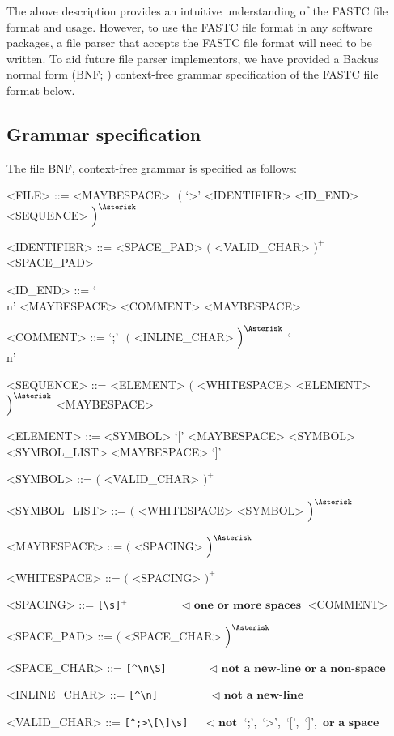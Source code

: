 \documentclass[12pt]{article}
\begin{document}
The above description provides an intuitive understanding of the FASTC file format and usage. However, to use the FASTC file format in any software packages, a file parser that accepts the FASTC file format will need to be written. To aid future file parser implementors, we have provided a Backus normal form (BNF; \citealp{Naur1961}) context-free grammar specification of the FASTC file format below.

\pagebreak

\subsection{Grammar specification}
The file BNF, context-free grammar is specified as follows:

\setlength{\grammarindent}{10em} %

\begin{grammar}

  <FILE>         ::=  <MAYBESPACE> $\,\,\Big($ `>' <IDENTIFIER> <ID_END> <SEQUENCE> $\Big)^{\Asterisk}$

  <IDENTIFIER>   ::=  <SPACE_PAD> $\Big($ <VALID_CHAR> $\Big)^{+}$ <SPACE_PAD>

  <ID_END>       ::=  `\\n' <MAYBESPACE>
                 \alt <COMMENT> <MAYBESPACE>

  <COMMENT>      ::=  `;' $\,\,\Big($ <INLINE_CHAR> $\Big)^{\Asterisk}$ `\\n'

  <SEQUENCE>     ::=  <ELEMENT> $\Big($ <WHITESPACE> <ELEMENT> $\Big)^{\Asterisk}$ <MAYBESPACE>
  
  <ELEMENT>      ::=  <SYMBOL>
                 \alt `[' <MAYBESPACE> <SYMBOL> <SYMBOL_LIST> <MAYBESPACE> `]'
 
  <SYMBOL>       ::=  $\Big($ <VALID_CHAR> $\Big)^{+}$
                 
  <SYMBOL_LIST>  ::=  $\Big($ <WHITESPACE> <SYMBOL> $\Big)^{\Asterisk}$
  
  <MAYBESPACE>   ::=  $\Big($ <SPACING> $\Big)^{\Asterisk}$

  <WHITESPACE>   ::=  $\Big($ <SPACING>  $\Big)^{+}$

  <SPACING>      ::=  \verb![\s]!$^{+}$  $\quad\,\quad\quad\quad \lhd \,\, \textbf{one or more spaces}$
                 \alt <COMMENT>

  <SPACE_PAD>    ::=  $\Big($ <SPACE_CHAR> $\Big)^{\Asterisk}$

  <SPACE_CHAR>   ::=  \verb![^\n\S]!     $\quad\,\quad\quad      \lhd \,\, \textbf{not a new-line or a non-space}$

  <INLINE_CHAR>  ::=  \verb![^\n]!       $\quad\,\quad\quad\quad \lhd \,\, \textbf{not a new-line}$

  <VALID_CHAR>   ::=  \verb![^;>\[\]\s]! $\quad                  \lhd \,\, \textbf{not}$ `;',$\,$ `>',$\,$ `[',$\,$ `]', $\,\textbf{or a space}$


  
\end{grammar}
\end{document}
